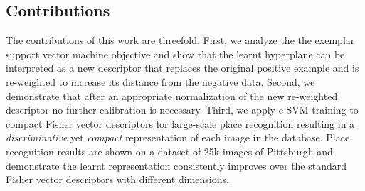 \documentclass[table]{article} %
\begin{document}
\vspace{-3mm}
\subsection*{Contributions} \vspace{-3mm}
    The contributions of this work are threefold.
    First, we analyze the the exemplar support vector machine objective and show that the learnt hyperplane can be interpreted
    as a new descriptor that replaces the original positive example and is re-weighted to increase its distance from the negative data.
    Second, we demonstrate that after an appropriate normalization of the new re-weighted descriptor no further calibration is necessary. 
    Third, we apply e-SVM training to compact Fisher vector descriptors for large-scale place recognition resulting in  
    a {\em discriminative} yet {\em compact} representation of each image in the database. 
    Place recognition results are shown on a dataset of 25k images of Pittsburgh and demonstrate the learnt representation
    consistently improves over the standard Fisher vector descriptors with different dimensions. 
\end{document}
